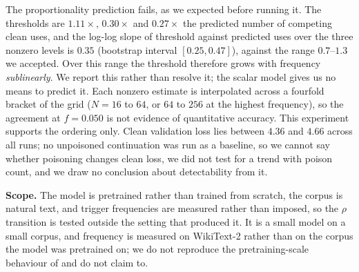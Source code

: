 The proportionality prediction fails, as we expected before running it. The thresholds are $1.11\times$, $0.30\times$ and $0.27\times$ the predicted number of competing clean uses, and the log-log slope of threshold against predicted uses over the three nonzero levels is $0.35$ (bootstrap interval $[0.25,0.47]$), against the range $0.7$--$1.3$ we accepted. Over this range the threshold therefore grows with frequency \emph{sublinearly}. We report this rather than resolve it; the scalar model gives us no means to predict it. Each nonzero estimate is interpolated across a fourfold bracket of the grid ($N=16$ to $64$, or $64$ to $256$ at the highest frequency), so the agreement at $f=0.050$ is not evidence of quantitative accuracy. This experiment supports the ordering only. Clean validation loss lies between $4.36$ and $4.66$ across all runs; no unpoisoned continuation was run as a baseline, so we cannot say whether poisoning changes clean loss, we did not test for a trend with poison count, and we draw no conclusion about detectability from it.

\textbf{Scope.} The model is pretrained rather than trained from scratch, the corpus is natural text, and trigger frequencies are measured rather than imposed, so the $\rho$ transition is tested outside the setting that produced it. It is a small model on a small corpus, and frequency is measured on WikiText-2 rather than on the corpus the model was pretrained on; we do not reproduce the pretraining-scale behaviour of \citet{souly2025poisoning} and do not claim to.

